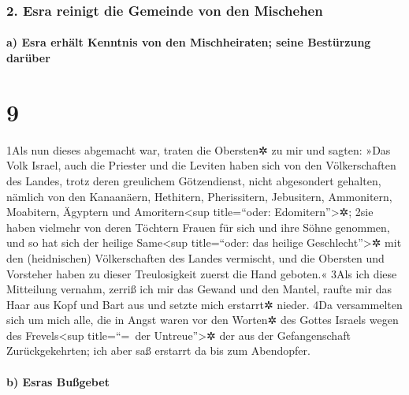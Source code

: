 \hypertarget{esra-reinigt-die-gemeinde-von-den-mischehen}{%
\subsubsection{2. Esra reinigt die Gemeinde von den
Mischehen}\label{esra-reinigt-die-gemeinde-von-den-mischehen}}

\hypertarget{a-esra-erhuxe4lt-kenntnis-von-den-mischheiraten-seine-bestuxfcrzung-daruxfcber}{%
\paragraph{a) Esra erhält Kenntnis von den Mischheiraten; seine
Bestürzung
darüber}\label{a-esra-erhuxe4lt-kenntnis-von-den-mischheiraten-seine-bestuxfcrzung-daruxfcber}}

\hypertarget{section-8}{%
\section{9}\label{section-8}}

1Als nun dieses abgemacht war, traten die Obersten✲ zu mir und sagten:
»Das Volk Israel, auch die Priester und die Leviten haben sich von den
Völkerschaften des Landes, trotz deren greulichem Götzendienst, nicht
abgesondert gehalten, nämlich von den Kanaanäern, Hethitern,
Pherissitern, Jebusitern, Ammonitern, Moabitern, Ägyptern und
Amoritern\textless sup title=``oder: Edomitern''\textgreater✲; 2sie
haben vielmehr von deren Töchtern Frauen für sich und ihre Söhne
genommen, und so hat sich der heilige Same\textless sup title=``oder:
das heilige Geschlecht''\textgreater✲ mit den (heidnischen)
Völkerschaften des Landes vermischt, und die Obersten und Vorsteher
haben zu dieser Treulosigkeit zuerst die Hand geboten.« 3Als ich diese
Mitteilung vernahm, zerriß ich mir das Gewand und den Mantel, raufte mir
das Haar aus Kopf und Bart aus und setzte mich erstarrt✲ nieder. 4Da
versammelten sich um mich alle, die in Angst waren vor den Worten✲ des
Gottes Israels wegen des Frevels\textless sup title=``=~der
Untreue''\textgreater✲ der aus der Gefangenschaft Zurückgekehrten; ich
aber saß erstarrt da bis zum Abendopfer.

\hypertarget{b-esras-buuxdfgebet}{%
\paragraph{b) Esras Bußgebet}\label{b-esras-buuxdfgebet}}

